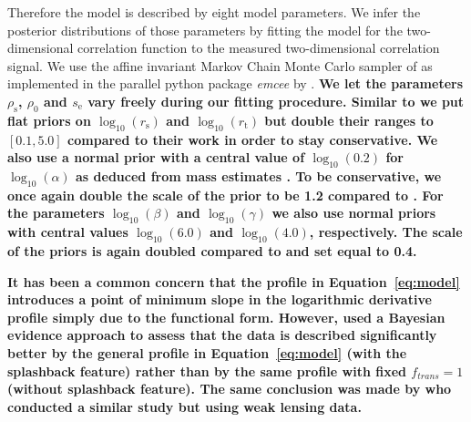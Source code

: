\documentclass[iop, apjl, twocolappendix, numberedappendix]{emulateapj}
\begin{document}
Therefore the model is described by eight model parameters.
We infer the posterior distributions of those parameters by fitting the model for the two-dimensional correlation
function to the measured two-dimensional correlation signal.
We use the affine invariant Markov Chain Monte Carlo sampler of \citet{goodman2010ensemble} as
implemented in the parallel python package {\it emcee} by
\citet{foreman2013emcee}.
\textbf{We let the parameters $\rho_{\mathrm{s}}$, $\rho_0$ and
$s_{\mathrm{e}}$ vary freely during our fitting procedure. Similar to
\citet{more2016detection} we put flat priors on $\log_{10}(r_{\mathrm{s}})$ and
$\log_{10}(r_{\mathrm{t}})$ but double their ranges to $[0.1,5.0]$ compared to
their work in order to stay conservative. We also use a normal prior with a
central value of $\log_{10}(0.2)$ for $\log_{10}(\alpha)$ as deduced from mass
estimates \citep{gao2008redshift}. To be conservative, we once again double the
scale of the prior to be 1.2 compared to \citet{more2016detection}. For the
parameters $\log_{10}(\beta)$ and $\log_{10}(\gamma)$ we also use
normal priors with central values $\log_{10}(6.0)$ and
$\log_{10}(4.0)$, respectively. The scale of the priors is again
doubled compared to \citet{more2016detection} and set equal to 0.4.}

\textbf{It has been a common concern that the profile in
Equation~\ref{eq:model} introduces a point of minimum slope in the logarithmic
derivative profile simply due to the functional form. However,
\citet{baxter2017halo} used a Bayesian evidence approach to assess that the
data is described significantly better by the general profile in
Equation~\ref{eq:model} (with the splashback feature) rather than by the same
profile with fixed $f_{trans} = 1$ (without splashback feature).  The same
conclusion was made by \citet{umetsu2017lensing} who conducted a similar study
but using weak lensing data.}
\end{document}
